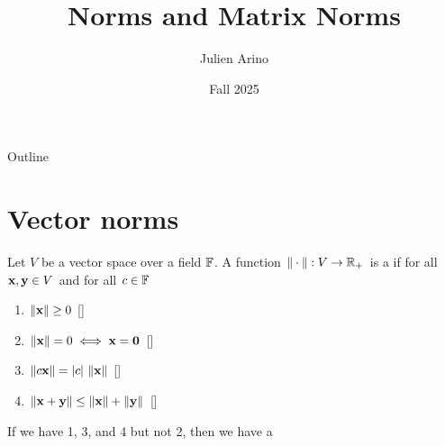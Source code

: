 \documentclass[aspectratio=169]{beamer}
\title{Norms and Matrix Norms}
\author{Julien Arino}
\date{Fall 2025}
\begin{document}
\begin{frame}
	\titlepage
\end{frame}
\addtocounter{page}{-1}
  
  
\begin{frame}{Outline}
	  \tableofcontents[hideallsubsections]
\end{frame}
\addtocounter{page}{-1}


\section{Vector norms}
\label{sec:vector_norms}


\begin{frame}
\begin{definition}[Norm]
Let $V$ be a vector space over a field $\mathbb{F}$. A function $\| \cdot \|: V\to \mathbb{R}_{+}$ is a  if for all $\mathbf{x},\mathbf{y}\in V$ and for all $c\in \mathbb{F}$
\begin{enumerate}
    \item $\|\mathbf{x}\| \geq 0$ \hfill[]
    \item $\|\bx\|=0 \iff\bx=\b0$ \hfill[]
    \item $\|c\mathbf{x}\| =|c|\ \|\mathbf{x}\|$ \hfill[]
    \item $\|\mathbf{x}+\mathbf{y} \|\leq \|\mathbf{x}\| + \|\mathbf{y}\|$ \hfill[]
\end{enumerate}
\end{definition}
\vfill
\begin{remark}
If we have 1, 3, and 4 but not 2, then we have a 
\end{remark}
\end{frame}
\end{document}
